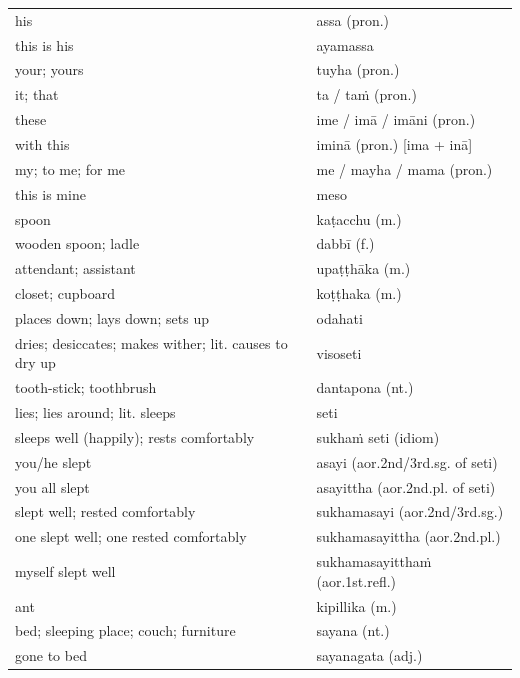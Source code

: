 \documentclass[11pt,oneside]{memoir}
\begin{document}
\begin{center}
\begin{tabular}{ll}
his & assa (pron.)\\
this is his & ayamassa\\
your; yours & tuyha (pron.)\\
it; that & ta / taṁ (pron.)\\
these & ime / imā / imāni (pron.)\\
with this & iminā (pron.) [ima + inā]\\
my; to me; for me & me / mayha / mama (pron.)\\
this is mine & meso\\
spoon & kaṭacchu (m.)\\
wooden spoon; ladle & dabbī (f.)\\
attendant; assistant & upaṭṭhāka (m.)\\
closet; cupboard & koṭṭhaka (m.)\\
places down; lays down; sets up & odahati\\
dries; desiccates; makes wither; lit. causes to dry up & visoseti\\
tooth-stick; toothbrush & dantapona (nt.)\\
lies; lies around; lit. sleeps & seti\\
sleeps well (happily); rests comfortably & sukhaṁ seti (idiom)\\
you/he slept & asayi (aor.2nd/3rd.sg. of seti)\\
you all slept & asayittha (aor.2nd.pl. of seti)\\
slept well; rested comfortably & sukhamasayi (aor.2nd/3rd.sg.)\\
one slept well; one rested comfortably & sukhamasayittha (aor.2nd.pl.)\\
myself slept well & sukhamasayitthaṁ (aor.1st.refl.)\\
ant & kipillika (m.)\\
bed; sleeping place; couch; furniture & sayana (nt.)\\
gone to bed & sayanagata (adj.)\\
\end{tabular}
\end{center}

\renewcommand{\arraystretch}{1.8}
\end{document}
